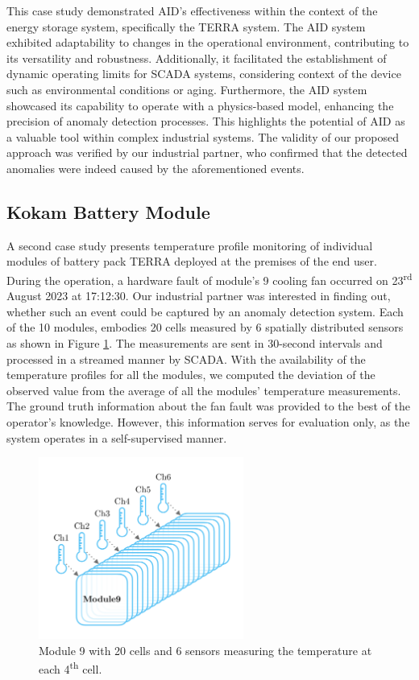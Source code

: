 This case study demonstrated AID's effectiveness  within the context of the energy storage system, specifically the TERRA system. The AID system exhibited adaptability to changes in the operational environment, contributing to its versatility and robustness. Additionally, it facilitated the establishment of dynamic operating limits for SCADA systems, considering context of the device such as environmental conditions or aging. Furthermore, the AID system showcased its capability to operate with a physics-based model, enhancing the precision of anomaly detection processes. This highlights the potential of AID as a valuable tool within complex industrial systems. The validity of our proposed approach was verified by our industrial partner, who confirmed that the detected anomalies were indeed caused by the aforementioned events.

\subsection{Kokam Battery Module}\label{AA:Kokam}
A second case study presents temperature profile monitoring of individual modules of battery pack TERRA deployed at the premises of the end user. During the operation, a hardware fault of module's 9 cooling fan occurred on 23\textsuperscript{rd} August 2023 at 17:12:30. Our industrial partner was interested in finding out, whether such an event could be captured by an anomaly detection system. Each of the 10 modules, embodies 20 cells measured by 6 spatially distributed sensors as shown in Figure \ref{fig:kokam_module}. The measurements are sent in 30-second intervals and processed in a streamed manner by SCADA. With the availability of the temperature profiles for all the modules, we computed the deviation of the observed value from the average of all the modules' temperature measurements. The ground truth information about the fan fault was provided to the best of the operator's knowledge. However, this information serves for evaluation only, as the system operates in a self-supervised manner.

\begin{figure}[htbp]
\centering
 \includegraphics[width=0.6\textwidth]{figures/Kokam_module9_measure points.pdf}
 \caption{Module 9 with 20 cells and 6 sensors measuring the temperature at each 4\textsuperscript{th} cell.}
 \label{fig:kokam_module}
\end{figure}

